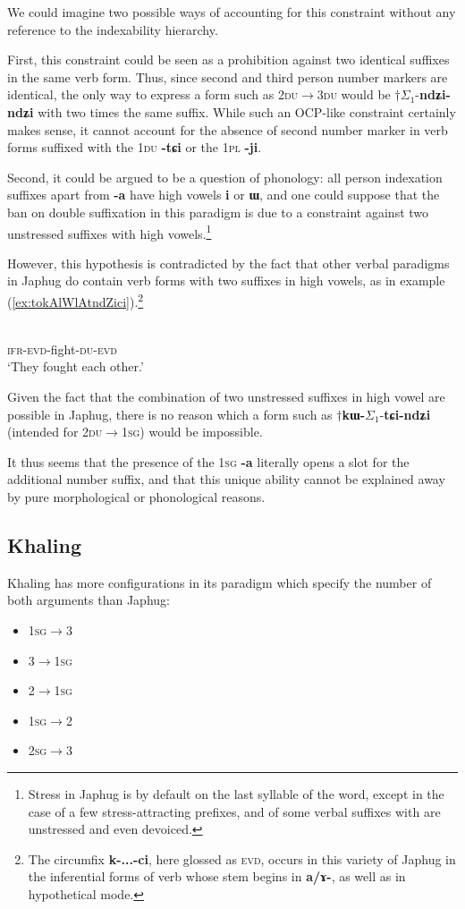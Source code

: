 \documentclass{article}
\newcommand{\ipa}[1]{{\phon\textbf{#1}}}
\newcommand{\siga}{$\Sigma_1$}
\begin{document}
We could imagine two possible ways of accounting for this constraint without any reference to the indexability hierarchy.

First, this constraint could be seen as a prohibition against two identical suffixes in the same verb form. Thus, since second and third person number markers are identical, the only way to express a form such as \textsc{2du$\rightarrow$3du} would be $\dagger$\siga{}-\ipa{ndʑi-ndʑi} with two times the same suffix. While such an OCP-like constraint certainly makes sense, it cannot account for the absence of second number marker in verb forms suffixed with the \textsc{1du} \ipa{-tɕi} or the \textsc{1pl} \ipa{-ji}.

Second, it could be argued to be a question of phonology: all person indexation suffixes apart from \ipa{-a} have high vowels \ipa{i} or \ipa{ɯ}, and one could suppose that the ban on double suffixation in this paradigm is due to a constraint against two unstressed suffixes with high vowels.\footnote{Stress in Japhug is by default on the last syllable of the word, except in the case of a few stress-attracting prefixes, and of some verbal suffixes with are unstressed and even devoiced.}

However, this hypothesis is contradicted by the fact that other verbal paradigms in Japhug do contain verb forms with two suffixes in high vowels, as in example (\ref{ex:tokAlWlAtndZici}).\footnote{The circumfix \ipa{k-...-ci}, here glossed as \textsc{evd}, occurs in this variety of Japhug in the inferential forms of verb whose stem begins in \ipa{a/ɤ-}, as well as in hypothetical mode. }

\begin{exe}
\ex \label{ex:tokAlWlAtndZici}
\gll \ipa{to-k-ɤlɯlɤt-ndʑi-ci} \\
\textsc{ifr-evd}-fight-\textsc{du-evd} \\
\glt `They fought each other.'
\end{exe}

Given the fact that the combination of two unstressed suffixes in high vowel are possible in Japhug, there is no reason which a form such as $\dagger$\ipa{kɯ-}\siga{}-\ipa{tɕi-ndʑi} (intended for \textsc{2du$\rightarrow$1sg}) would be impossible.

It thus seems that the presence of the \textsc{1sg} \ipa{-a} literally opens a slot for the additional number suffix, and that this unique ability cannot be explained away by pure morphological or phonological reasons. 

\subsection{Khaling}
Khaling has more configurations in its paradigm which specify the number of both arguments than Japhug:
\begin{itemize}
\item  \textsc{1sg}$\rightarrow$3
\item 3$\rightarrow$\textsc{1sg} 
\item 2$\rightarrow$\textsc{1sg}
\item \textsc{1sg}$\rightarrow$2
\item \textsc{2sg}$\rightarrow$3
\end{itemize}
\end{document}
